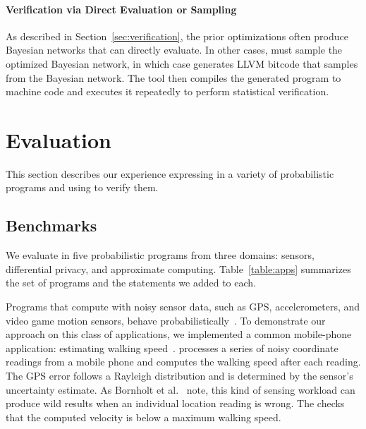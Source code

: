 \paragraph{Verification via Direct Evaluation or Sampling}
As described in Section~\ref{sec:verification}, the prior
optimizations often produce Bayesian networks that \tool can
directly evaluate.  In other cases, \tool must sample the
optimized Bayesian network, in which case \tool generates LLVM bitcode
that samples from the Bayesian network.
The tool then compiles the generated program to machine code and executes
it repeatedly to perform statistical verification.



\section{Evaluation}
\label{sec:evaluation}


This section describes our experience expressing \passerts in a variety of
probabilistic programs and using \tool to verify them.

\subsection{Benchmarks}

We evaluate \passerts in five probabilistic programs
from three domains: sensors, differential privacy, and approximate
computing. 
Table~\ref{table:apps} summarizes the set of programs and the \passert
statements we added to each.

Programs that compute with noisy sensor data, such as GPS,
accelerometers, and video game motion sensors, behave
probabilistically~\cite{PPT:05,uncertaint}. To demonstrate our
approach on this class of applications, we implemented a common
mobile-phone application: estimating walking speed~\cite{uncertaint}.
 processes a series of noisy coordinate readings from a mobile
phone and computes the walking speed after each reading.
The GPS error follows a Rayleigh distribution and is determined by the sensor's
uncertainty estimate.
As Bornholt et al.~\cite{uncertaint} note, this kind of sensing workload can
produce wild results when an individual location reading is wrong.
The \passert checks that the computed velocity is below a maximum walking
speed.

